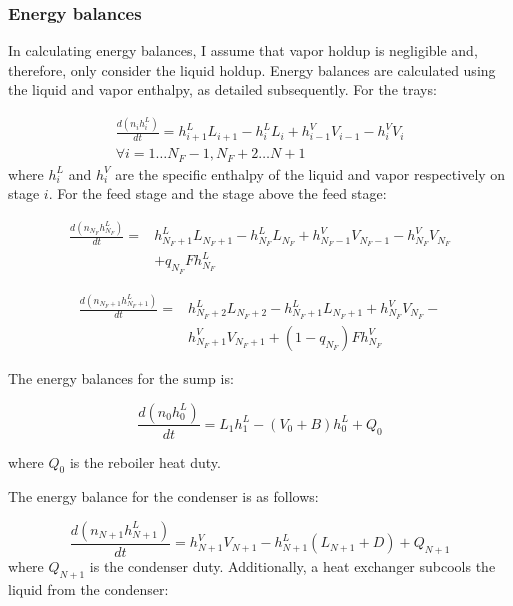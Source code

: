 \subsubsection{Energy balances}\label{sec:energy_balances}

In calculating energy balances, I assume that vapor holdup is negligible and, therefore, only consider the liquid holdup. Energy balances are calculated using the liquid and vapor enthalpy, as detailed subsequently. For the trays:

\begin{equation}
\begin{split}
    \frac{d(n_ih^L_i)}{dt} = h^L_{i+1}L_{i+1}-h^L_iL_i+h^V_{i-1}V_{i-1}-h^V_iV_i \\ \forall i=1 \dots N_F-1, N_F+2 \dots N+1
\end{split}
\end{equation}
where $h^L_i$ and $h^V_i$ are the specific enthalpy of the liquid and vapor respectively on stage $i$. For the feed stage and the stage above the feed stage:

\begin{equation}
\begin{split}
    \frac{d(n_{N_F}h^L_{N_F})}{dt} = & h^L_{N_F+1}L_{N_F+1}-h^L_{N_F}L_{N_F} + h^V_{N_F-1}V_{N_F-1}-h^V_{N_F}V_{N_F} \\ &  + q_{N_F}F h^L_{N_F}
\end{split}
\end{equation}


\begin{equation}
\begin{split}
    \frac{d(n_{N_F+1}h^L_{N_F+1})}{dt} = & h^L_{N_F+2}L_{N_F+2}-h^L_{N_F+1}L_{N_F+1} +h^V_{N_F} V_{N_F}-\\ &h^V_{N_F+1} V_{N_F+1} + (1-q_{N_F})Fh^V_{N_F}
\end{split}
\end{equation}

 The energy balances for the sump is:

\begin{equation}
    \frac{d(n_0h^L_0)}{dt} = L_1 h^L_1 - (V_0 + B) h^L_0 + Q_0
\end{equation}

where $Q_0$ is the reboiler heat duty.

\noindent The energy balance for the condenser is as follows:

\begin{equation}
    \frac{d(n_{N+1}h^L_{N+1})}{dt} = h^V_{N+1} V_{N+1}-h^L_{N+1}(L_{N+1} + D) + Q_{N+1}
\end{equation}
where $Q_{N+1}$ is the condenser duty. Additionally, a heat exchanger subcools the liquid from the condenser:

